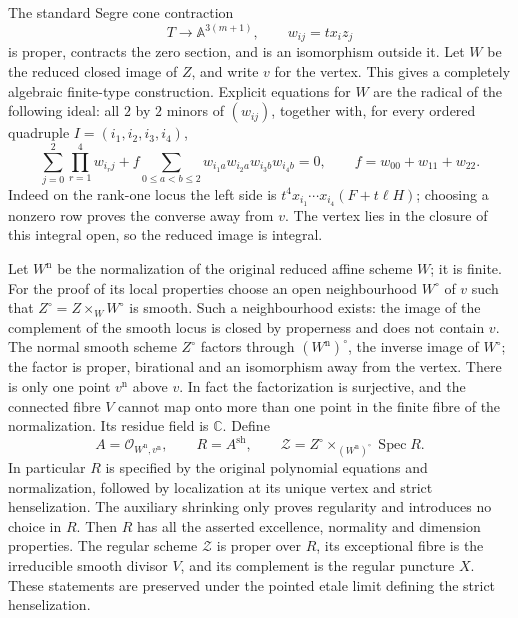The standard Segre cone contraction
\[
      T\longrightarrow\mathbb A^{3(m+1)},
           \qquad w_{ij}=t x_i z_j
\]
is proper, contracts the zero section, and is an
isomorphism outside it. Let $W$ be the reduced
closed image of $Z$, and write $v$ for the vertex.
This gives a completely algebraic finite-type
construction. Explicit equations for $W$ are the
radical of the following ideal: all $2$ by $2$
minors of $(w_{ij})$, together with, for every
ordered quadruple $I=(i_1,i_2,i_3,i_4)$,
\begin{equation}\label{eq:C3-deformed-cone-equations}
 \sum_{j=0}^{2}\prod_{r=1}^{4}w_{i_rj}
 +f\sum_{0\le a<b\le2}
       w_{i_1a}w_{i_2a}w_{i_3b}w_{i_4b}=0,
 \qquad f=w_{00}+w_{11}+w_{22}.
\end{equation}
Indeed on the rank-one locus the left side is
$t^4x_{i_1}\cdots x_{i_4}(F+t\ell H)$;
choosing a nonzero row proves the converse away
from $v$. The vertex lies in the closure of this
integral open, so the reduced image is integral.

Let $W^{\mathrm n}$ be the normalization of the
original reduced affine scheme $W$; it is finite.
For the proof of its local properties choose an
open neighbourhood $W^\circ$ of $v$ such that
$Z^\circ=Z\times_W W^\circ$ is smooth.
Such a neighbourhood exists: the image of the
complement of the smooth locus is closed by
properness and does not contain $v$.
The normal smooth scheme $Z^\circ$ factors
through $(W^{\mathrm n})^\circ$, the inverse image
of $W^\circ$; the factor is proper, birational
and an isomorphism away from the vertex.
There is only one point $v^{\mathrm n}$ above $v$.
In fact the factorization is surjective, and the
connected fibre $V$ cannot map onto more than one
point in the finite fibre of the normalization.
Its residue field is $\mathbb C$. Define
\[
 A=\mathcal O_{W^{\mathrm n},v^{\mathrm n}},
 \qquad R=A^{\mathrm{sh}},
 \qquad
 \mathcal Z=Z^\circ\times_{(W^{\mathrm n})^\circ}
                         \operatorname{Spec}R.
\]
In particular $R$ is specified by the original
polynomial equations and normalization, followed
by localization at its unique vertex and strict
henselization. The auxiliary shrinking only
proves regularity and introduces no choice in $R$.
Then $R$ has all the asserted excellence, normality
and dimension properties. The regular scheme
$\mathcal Z$ is proper over $R$, its exceptional
fibre is the irreducible smooth divisor $V$, and
its complement is the regular puncture $X$.
These statements are preserved under the pointed
etale limit defining the strict henselization.

